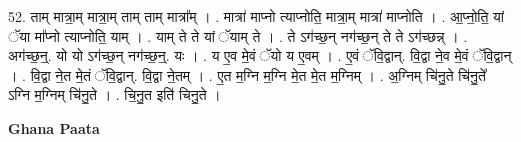 \documentclass[17pt]{extarticle}
\begin{document}
52. ताम् मात्रा॒म् मात्रा॒म् ताम् ताम् मात्रा᳚म् । . मात्रा॑ माप्नो त्याप्नोति॒ मात्रा॒म् मात्रा॑ माप्नोति । . आ॒प्नो॒ति॒ यां ॅया मा᳚प्नो त्याप्नोति॒ याम् । . याम् ते ते यां ॅयाम् ते । . ते ऽग॑च्छ॒न् नग॑च्छ॒न् ते ते ऽग॑च्छन्न् । . अग॑च्छ॒न्॒. यो यो ऽग॑च्छ॒न् नग॑च्छ॒न्॒. यः । . य ए॒व मे॒वं ॅयो य ए॒वम् । . ए॒वं ॅवि॒द्वान्. वि॒द्वा ने॒व मे॒वं ॅवि॒द्वान् । . वि॒द्वा ने॒त मे॒तं ॅवि॒द्वान्. वि॒द्वा ने॒तम् । . ए॒त म॒ग्नि म॒ग्नि मे॒त मे॒त म॒ग्निम् । . अ॒ग्निम् चि॑नु॒ते चि॑नु॒ते᳚ ऽग्नि म॒ग्निम् चि॑नु॒ते । . चि॒नु॒त इति॑ चिनु॒ते । \newline

\textbf{Ghana Paata } \newline
\end{document}
